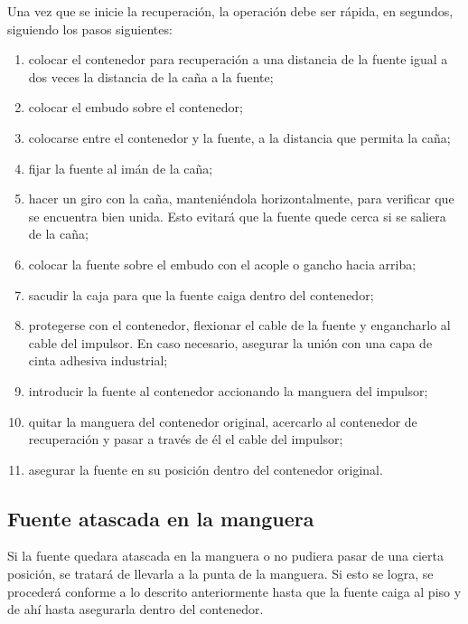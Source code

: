 Una vez que se inicie la recuperación, la operación debe ser rápida, en segundos, siguiendo los pasos siguientes:
\begin{enumerate}[label=\alph*)]
  \item colocar el contenedor para recuperación a una distancia de la fuente igual a dos veces la distancia de la caña a la fuente;
  \item colocar el embudo sobre el contenedor;
  \item colocarse entre el contenedor y la fuente, a la distancia que permita la caña;
  \item fijar la fuente al imán de la caña;
  \item hacer un giro con la caña, manteniéndola horizontalmente, para verificar que se encuentra bien unida. Esto evitará que la fuente quede cerca si se saliera de la caña;
  \item colocar la fuente sobre el embudo con el acople o gancho hacia arriba;
  \item sacudir la caja para que la fuente caiga dentro del contenedor;
  \item protegerse con el contenedor, flexionar el cable de la fuente y engancharlo al cable del impulsor. En caso necesario, asegurar la unión con una capa de cinta adhesiva industrial;
  \item introducir la fuente al contenedor accionando la manguera del impulsor;
  \item quitar la manguera del contenedor original, acercarlo al contenedor de recuperación y pasar a través de él el cable del impulsor;
  \item asegurar la fuente en su posición dentro del contenedor original.
\end{enumerate}

\subsection{Fuente atascada en la manguera}

Si la fuente quedara atascada en la manguera o no pudiera pasar de una cierta posición, se tratará de llevarla a la punta de la manguera. Si esto se logra, se procederá conforme a lo descrito anteriormente hasta que la fuente caiga al piso y de ahí hasta asegurarla dentro del contenedor.

